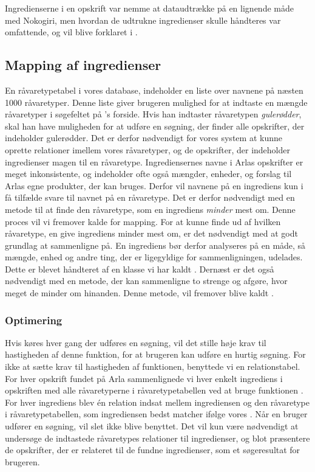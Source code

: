 Ingredienserne i en opskrift var nemme at dataudtrække på en lignende måde med Nokogiri, men hvordan de udtrukne ingredienser skulle håndteres var omfattende, og vil blive forklaret i .

\subsection{Mapping af ingredienser}
\label{sec:mapping}
En råvaretypetabel i vores database, indeholder en liste over navnene på næsten 1000 råvaretyper. Denne liste giver brugeren mulighed for at indtaste en mængde råvaretyper i søgefeltet på \Foodl{}'s forside. Hvis han indtaster råvaretypen \textit{gulerødder}, skal han have muligheden for at udføre en søgning, der finder alle opskrifter, der indeholder gulerødder. Det er derfor nødvendigt for vores system at kunne oprette relationer imellem vores råvaretyper, og de opskrifter, der indeholder ingredienser magen til en råvaretype. Ingrediensernes navne i Arlas opskrifter er meget inkonsistente, og indeholder ofte også mængder, enheder, og forslag til Arlas egne produkter, der kan bruges. Derfor vil navnene på en ingrediens kun i få tilfælde svare til navnet på en råvaretype. Det er derfor nødvendigt med en metode til at finde den råvaretype, som en ingrediens \textit{minder} mest om. Denne proces vil vi fremover kalde for mapping. For at kunne finde ud af hvilken råvaretype, en give ingrediens minder mest om, er det nødvendigt med at godt grundlag at sammenligne på. En ingrediens bør derfor analyseres på en måde, så mængde, enhed og andre ting, der er ligegyldige for sammenligningen, udelades. Dette er blevet håndteret af en klasse vi har kaldt . Dernæst er det også nødvendigt med en metode, der kan sammenligne to strenge og afgøre, hvor meget de minder om hinanden. Denne metode, vil fremover blive kaldt .

\subsubsection{Optimering}
Hvis  køres hver gang der udføres en søgning, vil det stille høje krav til hastigheden af denne funktion, for at brugeren kan udføre en hurtig søgning. For ikke at sætte krav til hastigheden af funktionen, benyttede vi en relationstabel. For hver opskrift fundet på Arla sammenlignede vi hver enkelt ingrediens i opskriften med alle råvaretyperne i råvaretypetabellen ved at bruge funktionen . For hver ingrediens blev én relation indsat mellem ingrediensen og den råvaretype i råvaretypetabellen, som ingrediensen bedst matcher ifølge vores . Når en bruger udfører en søgning, vil  slet ikke blive benyttet. Det vil kun være nødvendigt at undersøge de indtastede råvaretypes relationer til ingredienser, og blot præsentere de opskrifter, der er relateret til de fundne ingredienser, som et søgeresultat for brugeren.

